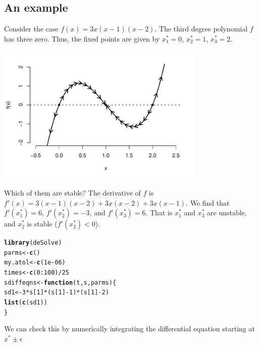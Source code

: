 \documentclass[Tutorial]{../cbg}\usepackage[]{graphicx}\usepackage[]{color}
\makeatletter
\newcommand{\hlnum}[1]{\textcolor[rgb]{0.686,0.059,0.569}{#1}}%
\newcommand{\hlopt}[1]{\textcolor[rgb]{0,0,0}{#1}}%
\newcommand{\hlstd}[1]{\textcolor[rgb]{0.345,0.345,0.345}{#1}}%
\newcommand{\hlkwa}[1]{\textcolor[rgb]{0.161,0.373,0.58}{\textbf{#1}}}%
\newcommand{\hlkwb}[1]{\textcolor[rgb]{0.69,0.353,0.396}{#1}}%
\newcommand{\hlkwc}[1]{\textcolor[rgb]{0.333,0.667,0.333}{#1}}%
\newcommand{\hlkwd}[1]{\textcolor[rgb]{0.737,0.353,0.396}{\textbf{#1}}}%
\newenvironment{kframe}{%
 \def\at@end@of@kframe{}%
 \ifinner\ifhmode%
  \def\at@end@of@kframe{\end{minipage}}%
  \begin{minipage}{\columnwidth}%
 \fi\fi%
 \def\FrameCommand##1{\hskip\@totalleftmargin \hskip-\fboxsep
 \colorbox{shadecolor}{##1}\hskip-\fboxsep
     \hskip-\linewidth \hskip-\@totalleftmargin \hskip\columnwidth}%
 \MakeFramed {\advance\hsize-\width
   \@totalleftmargin\z@ \linewidth\hsize
   \@setminipage}}%
 {\par\unskip\endMakeFramed%
 \at@end@of@kframe}
\newenvironment{knitrout}{}{} %
\makeatother
\begin{document}
	\subsection{An example}
	Consider the case $f(x)=3x(x-1)(x-2)$. The third degree polynomial $f$ has three zero. Thus, the fixed points are given by $x_1^*=0$, $x_2^*=1$, $x_3^*=2$.
	\begin{center}
		\includegraphics[width=10cm]{tutorial-p1.pdf}
	\end{center}
	
	Which of them are stable? The derivative of $f$ is $f'(x)=3(x-1)(x-2) + 3x(x-2) + 3x(x-1)$. We find that $f'(x_1^*)=6 $, $f'(x_2^*)=-3$, and $f'(x_3^*)=6$. That is $x_1^*$ and $x_3^*$ are unstable, and $x_2^*$ is stable ($f'(x_2^*) < 0$).

\begin{knitrout}
\color{fgcolor}\begin{kframe}
\begin{alltt}
\hlkwd{library}\hlstd{(deSolve)}
\hlstd{parms} \hlkwb{<-} \hlkwd{c}\hlstd{()}
\hlstd{my.atol} \hlkwb{<-} \hlkwd{c}\hlstd{(}\hlnum{1e-06}\hlstd{)}
\hlstd{times} \hlkwb{<-} \hlkwd{c}\hlstd{(}\hlnum{0}\hlopt{:}\hlnum{100}\hlstd{)}\hlopt{/}\hlnum{25}
\hlstd{sdiffeqns} \hlkwb{<-} \hlkwa{function}\hlstd{(}\hlkwc{t}\hlstd{,} \hlkwc{s}\hlstd{,} \hlkwc{parms}\hlstd{) \{}
    \hlstd{sd1} \hlkwb{<-} \hlnum{3} \hlopt{*} \hlstd{s[}\hlnum{1}\hlstd{]} \hlopt{*} \hlstd{(s[}\hlnum{1}\hlstd{]} \hlopt{-} \hlnum{1}\hlstd{)} \hlopt{*} \hlstd{(s[}\hlnum{1}\hlstd{]} \hlopt{-} \hlnum{2}\hlstd{)}
    \hlkwd{list}\hlstd{(}\hlkwd{c}\hlstd{(sd1))}
\hlstd{\}}
\end{alltt}
\end{kframe}
\end{knitrout}

\nn We can check this by numerically integrating the differential equation starting at $x^{*}\pm\epsilon$
\end{document}
